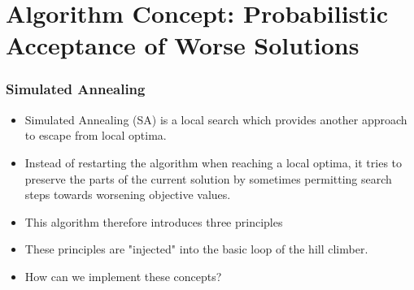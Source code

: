 \documentclass[mathserif]{beamer}%
\begin{document}
\section{Algorithm Concept: Probabilistic Acceptance of Worse Solutions}%
%
\begin{frame}%
\frametitle{Simulated Annealing}%
\begin{itemize}%
\item Simulated Annealing (SA)\cite{KGV1983OBSA,C1985TATTTSPAESA,DPSW1982MCTICO,P1970AMCMFTASOCTOCOP} is a local search which provides another approach to escape from local optima\cite{WGOEB,S2003ITSSAO}.%
\item<2-> Instead of restarting the algorithm when reaching a local optima, it tries to preserve the parts of the current solution by sometimes permitting search steps towards worsening objective values.%
\item<3-> This algorithm therefore introduces three principles%
\item<7-> These principles are "injected" into the basic loop of the hill climber.%
\item<8-> How can we implement these concepts?%
\end{itemize}%
\end{frame}%
%
\end{document}
